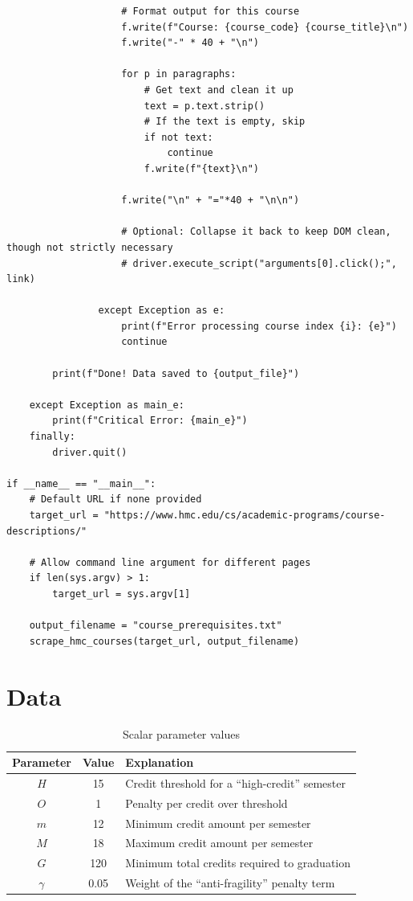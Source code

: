 \documentclass[12pt]{article}
\begin{document}
\begin{lstlisting}
                    # Format output for this course
                    f.write(f"Course: {course_code} {course_title}\n")
                    f.write("-" * 40 + "\n")
                    
                    for p in paragraphs:
                        # Get text and clean it up
                        text = p.text.strip()
                        # If the text is empty, skip
                        if not text:
                            continue
                        f.write(f"{text}\n")
                    
                    f.write("\n" + "="*40 + "\n\n")
                    
                    # Optional: Collapse it back to keep DOM clean, though not strictly necessary
                    # driver.execute_script("arguments[0].click();", link)
                    
                except Exception as e:
                    print(f"Error processing course index {i}: {e}")
                    continue

        print(f"Done! Data saved to {output_file}")

    except Exception as main_e:
        print(f"Critical Error: {main_e}")
    finally:
        driver.quit()

if __name__ == "__main__":
    # Default URL if none provided
    target_url = "https://www.hmc.edu/cs/academic-programs/course-descriptions/"
    
    # Allow command line argument for different pages
    if len(sys.argv) > 1:
        target_url = sys.argv[1]
        
    output_filename = "course_prerequisites.txt"
    scrape_hmc_courses(target_url, output_filename)
\end{lstlisting}

\section{Data}\label{app:data}

\begin{table}[H]
    \centering
    \begin{tabular}{|c|c|l|}
        \hline
        Parameter & Value & Explanation \\\hline
        $H$ & 15 & Credit threshold for a ``high-credit'' semester \\
        $O$ & 1 & Penalty per credit over threshold \\
        $m$ & 12 & Minimum credit amount per semester \\
        $M$ & 18 & Maximum credit amount per semester \\
        $G$ & 120 & Minimum total credits required to graduation \\
        $\gamma$ & 0.05 & Weight of the ``anti-fragility'' penalty term \\\hline
    \end{tabular}
    \caption{Scalar parameter values}
    \label{tab:parameters}
\end{table}
\end{document}
